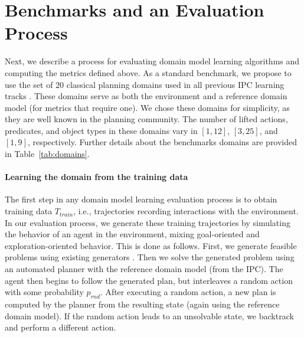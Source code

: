 \documentclass{article}
\theoremstyle{definition}
\theoremstyle{remark}
\newcommand{\T}{T}
\newcommand{\Ttrain}{\T_{train}}
\newif\ifaddcomments
\newcommand{\todo}[1]{\ifaddcomments{\textcolor{red}{[TODO: #1]}}\fi}
\newcommand{\roni}[1]{\ifaddcomments{\textcolor{red}{[Roni: #1]}}\fi}
\newcommand{\leo}[1]{\ifaddcomments{\textcolor{pink}{[Leonardo: #1]}}\fi}
\begin{document}
\section{Benchmarks and an Evaluation Process}






Next, we describe a process for evaluating domain model learning algorithms 
and computing the metrics defined above. %
%
As a standard benchmark, we propose to use the set of $20$ classical planning domains used in all previous IPC learning tracks \citep{fern2011first, vallati20152014, taitler20242023}. 
These domains serve as both the environment and a reference domain model (for metrics that require one). 
We chose these domains for simplicity, as they are well known in the planning community. 
The number of lifted actions, predicates, and object types in these domains vary in 
$[1, 12]$, $[3,25]$, and $[1, 9]$, respectively.
Further details about the benchmarks domains are provided in Table~\ref{tab:domains}. 

%
\paragraph{Learning the domain from the training data} 
The first step in any domain model learning evaluation process is to obtain training data $\Ttrain$, i.e., trajectories recording interactions with the environment. 
In our evaluation process, we generate these training trajectories by simulating the behavior of an agent in the environment, mixing goal-oriented and exploration-oriented behavior. 
This is done as follows. 
First, we generate feasible problems using existing generators \citep{seipp-et-al-zenodo2022}. 
Then we solve the generated problem using an automated planner with the reference domain model (from the IPC). 
The agent then begins to follow the generated plan, but interleaves a random action with some probability $p_{rnd}$.  
After executing a random action, a new plan is computed by the planner from the resulting state (again using the reference domain model). If the random action leads to an unsolvable state, we backtrack and perform a different action. 
\end{document}

